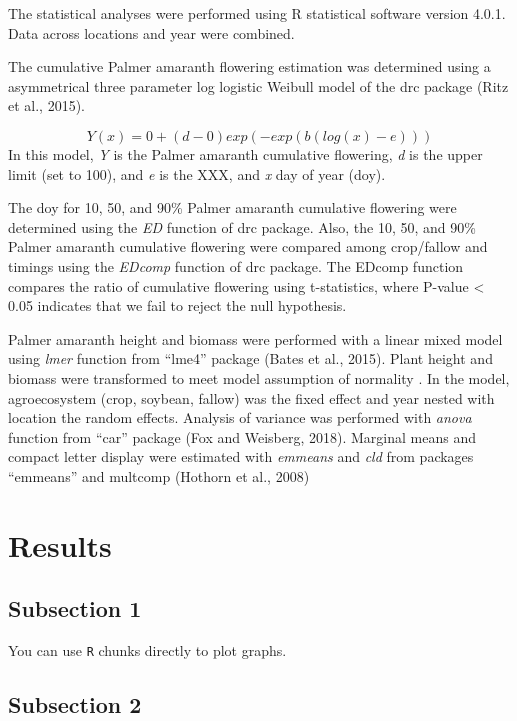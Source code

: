 \documentclass[utf8]{frontiersSCNS}
\begin{document}
The statistical analyses were performed using R statistical software
version 4.0.1. Data across locations and year were combined.

The cumulative Palmer amaranth flowering estimation was determined using
a asymmetrical three parameter log logistic Weibull model of the drc
package (Ritz et al., 2015).

\[Y(x) = 0 + (d-0) exp (-exp(b(log(x)-e)))\] In this model, \emph{Y} is
the Palmer amaranth cumulative flowering, \emph{d} is the upper limit
(set to 100), and \emph{e} is the XXX, and \emph{x} day of year (doy).

The doy for 10, 50, and 90\% Palmer amaranth cumulative flowering were
determined using the \emph{ED} function of drc package. Also, the 10,
50, and 90\% Palmer amaranth cumulative flowering were compared among
crop/fallow and timings using the \emph{EDcomp} function of drc package.
The EDcomp function compares the ratio of cumulative flowering using
t-statistics, where P-value \textless{} 0.05 indicates that we fail to
reject the null hypothesis.

Palmer amaranth height and biomass were performed with a linear mixed
model using \emph{lmer} function from ``lme4'' package (Bates et al.,
2015). Plant height and biomass were transformed to meet model
assumption of normality . In the model, agroecosystem (crop, soybean,
fallow) was the fixed effect and year nested with location the random
effects. Analysis of variance was performed with \emph{anova} function
from ``car'' package (Fox and Weisberg, 2018). Marginal means and
compact letter display were estimated with \emph{emmeans} and \emph{cld}
from packages ``emmeans'' and multcomp (Hothorn et al., 2008)

\hypertarget{results}{%
\section*{Results}\label{results}}

\hypertarget{subsection-1}{%
\subsection*{Subsection 1}\label{subsection-1}}

You can use \texttt{R} chunks directly to plot graphs.

\hypertarget{subsection-2}{%
\subsection*{Subsection 2}\label{subsection-2}}
\end{document}
